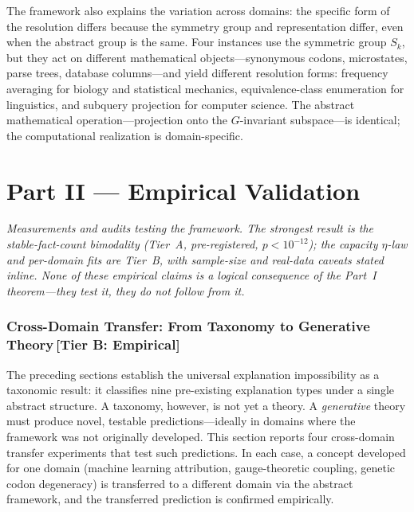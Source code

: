 \documentclass[11pt,a4paper]{article}
\begin{document}
The framework also explains the variation across domains: the specific form
of the resolution differs because the symmetry group and representation
differ, even when the abstract group is the same.  Four instances use the
symmetric group $S_k$, but they act on different mathematical
objects---synonymous codons, microstates, parse trees, database
columns---and yield different resolution forms: frequency averaging for
biology and statistical mechanics, equivalence-class enumeration for
linguistics, and subquery projection for computer science.  The abstract
mathematical operation---projection onto the $G$-invariant subspace---is
identical; the computational realization is domain-specific.


\clearpage
\part{Part II \textnormal{\large --- Empirical Validation}}
\noindent\emph{Measurements and audits testing the framework. The strongest result is the stable-fact-count bimodality (Tier~A, pre-registered, $p<10^{-12}$); the capacity $\eta$-law and per-domain fits are Tier~B, with sample-size and real-data caveats stated inline. None of these empirical claims is a logical consequence of the Part~I theorem---they test it, they do not follow from it.}\par\medskip

\section{Cross-Domain Transfer: From Taxonomy to Generative Theory\,\textnormal{\normalsize[Tier B: Empirical]}}
\label{sec:cross-domain}

The preceding sections establish the universal explanation impossibility as a
taxonomic result: it classifies nine pre-existing explanation types under a
single abstract structure.  A taxonomy, however, is not yet a theory.  A
\emph{generative} theory must produce novel, testable predictions---ideally in
domains where the framework was not originally developed.  This section reports
four cross-domain transfer experiments that test such predictions.  In each
case, a concept developed for one domain (machine learning attribution,
gauge-theoretic coupling, genetic codon degeneracy) is transferred to a
different domain via the abstract framework, and the transferred prediction is
confirmed empirically.
\end{document}
